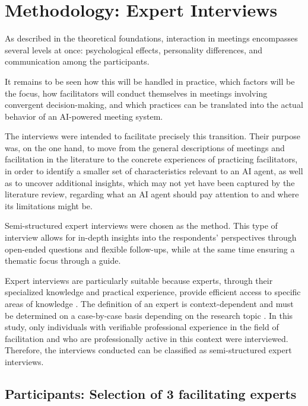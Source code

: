 \section{Methodology: Expert Interviews}
\label{sec:interview-methodology}

As described in the theoretical foundations, interaction in meetings encompasses several levels
at once: psychological effects, personality differences, and communication among the
participants.

It remains to be seen how this will be handled in practice, which factors will be the focus, how facilitators
will conduct themselves in meetings involving convergent decision-making, and which practices can be
translated into the actual behavior of an AI-powered meeting system.

The interviews were intended to facilitate precisely this transition. Their purpose was, on the one hand, to
move from the general descriptions of meetings and facilitation in the literature to the concrete experiences
of practicing facilitators, in order to identify a smaller set of characteristics relevant to an AI agent, as
well as to uncover additional insights, which may not yet have been captured by the literature review,
regarding what an AI agent should pay attention to and where its limitations might be.

Semi-structured expert interviews were chosen as the method. This type of interview allows for in-depth
insights into the respondents’ perspectives through open-ended questions and flexible follow-ups, while at the same time
ensuring a thematic focus through a guide.

Expert interviews are particularly suitable because experts, through their specialized knowledge and
practical experience, provide efficient access to specific areas of knowledge \cite[p.
877]{baurHandbuchMethodenEmpirischen2022}. The definition of an expert is context-dependent and must be
determined on a case-by-case basis depending on the research topic \cite[p.
877]{baurHandbuchMethodenEmpirischen2022}. In this study, only individuals with verifiable professional
experience in the field of facilitation and who are professionally active in this context were interviewed.
Therefore, the interviews conducted can be classified as semi-structured expert interviews.

\subsection{Participants: Selection of 3 facilitating experts}


